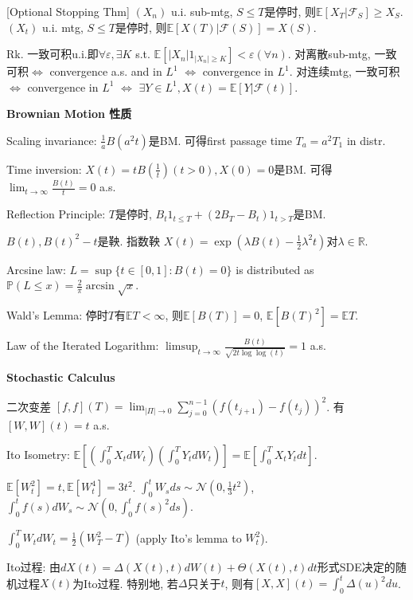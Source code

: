 \documentclass[UTF8]{ctexart}
\begin{document}
[Optional Stopping Thm] $(X_n)$ u.i. sub-mtg, $S\leq T$是停时, 则$\mathbb{E}[X_T|\mathcal{F}_S]\geq X_S$.
$(X_t)$ u.i. mtg, $S\leq T$是停时, 则$\mathbb{E}[X(T)|\mathcal{F}(S)]=X(S)$.

Rk. 一致可积u.i.即$\forall \varepsilon, \exists K$ s.t. $\mathbb{E}[|X_n|1_{|X_n|\geq K}]<\varepsilon (\forall n)$.
对离散sub-mtg, 一致可积$\Leftrightarrow$ convergence a.s. and in $L^1$  $\Leftrightarrow$ convergence in $L^1$.
对连续mtg, 一致可积$\Leftrightarrow$ convergence in $L^1$  $\Leftrightarrow$ $\exists Y\in L^1, X(t)=\mathbb{E}[Y|\mathcal{F}(t)]$.


\noindent \textbf{Brownian Motion 性质} \par
Scaling invariance: $\frac{1}{a} B(a^2t)$是BM. 可得first passage time $T_a=a^2 T_1$ in distr. \par
Time inversion: $X(t)=tB(\frac{1}{t})(t>0),X(0)=0$是BM. 可得 $\lim_{t\to\infty}\frac{B(t)}{t}=0$ a.s. \par
Reflection Principle: $T$是停时, $B_t1_{t\leq T}+(2B_T-B_t)1_{t>T}$是BM. \par
$B(t), B(t)^2-t$是鞅. 指数鞅 $X(t)=\exp(\lambda B(t)-\frac12 \lambda^2 t)$对$\lambda\in\mathbb{R}$. \par
Arcsine law: $L=\sup \{t\in[0,1]:B(t)=0\}$ is distributed as $\mathbb{P}(L\leq x)=\frac{2}{\pi}\arcsin\sqrt{x}$. \par
Wald's Lemma: 停时$T$有$\mathbb{E}T <\infty$, 则$\mathbb{E}[B(T)]=0$, $\mathbb{E}[B(T)^2]=\mathbb{E}T$. \par
Law of the Iterated Logarithm: $\limsup _{t \rightarrow \infty} \frac{B(t)}{\sqrt{2 t \log \log (t)}}=1$ a.s. \par



\noindent \textbf{Stochastic Calculus}

二次变差 $[f,f](T)=\lim_{|\Pi|\to 0} \sum_{j=0}^{n-1}(f(t_{j+1})-f(t_j))^2$. 有 $[W,W](t)=t$ a.s.

Ito Isometry: $\mathbb{E}\left[ (\int_0^T X_t dW_t)(\int_0^T Y_t dW_t) \right]
	=\mathbb{E}\left[ \int_0^T X_t Y_t dt \right]$.

$\mathbb{E}[W_t^2]=t, \mathbb{E}[W_t^4]=3t^2$.
$\int_0^t W_s ds \sim \mathcal{N}(0,\frac13 t^2)$,
$\int_0^t f(s) dW_s \sim \mathcal{N}\left(0,\int_0^t f(s)^2 ds\right)$.

$\int_0^T W_tdW_t = \frac12 (W_T^2-T)$ (apply Ito's lemma to $W_t^2$).

Ito过程: 由$dX(t)=\Delta(X(t),t)dW(t)+\Theta(X(t),t)dt$形式SDE决定的随机过程$X(t)$为Ito过程.
特别地, 若$\Delta$只关于$t$, 则有$[X,X](t)=\int_0^t \Delta(u)^2 du$.
\end{document}
